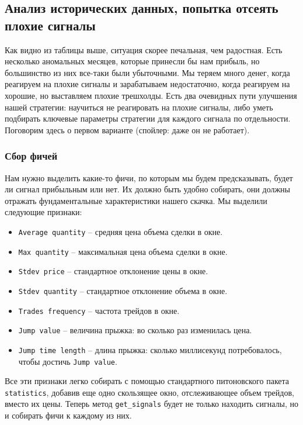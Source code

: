 \subsection{Анализ исторических данных, попытка отсеять плохие сигналы}
Как видно из таблицы выше, ситуация скорее печальная, чем радостная. Есть несколько аномальных месяцев, которые принесли бы нам прибыль, но большинство из них все-таки были убыточными. Мы теряем много денег, когда реагируем на плохие сигналы и зарабатываем недостаточно, когда реагируем на хорошие, но выставляем плохие трешхолды. Есть два очевидных пути улучшения нашей стратегии: научиться не реагировать на плохие сигналы, либо уметь подбирать ключевые параметры стратегии для каждого сигнала по отдельности. Поговорим здесь о первом варианте (спойлер: даже он не работает).

\subsubsection{Сбор фичей}
Нам нужно выделить какие-то фичи, по которым мы будем предсказывать, будет ли сигнал прибыльным или нет. Их должно быть удобно собирать, они должны отражать фундаментальные характеристики нашего скачка. Мы выделили следующие признаки:

\begin{itemize}
\item \texttt{Average quantity} -- средняя цена объема сделки в окне.
\item \texttt{Max quantity} -- максимальная цена объема сделки в окне.
\item \texttt{Stdev price} -- стандартное отклонение цены в окне.
\item \texttt{Stdev quantity} -- стандартное отклонение объема в окне.
\item \texttt{Trades frequency} -- частота трейдов в окне.
\item \texttt{Jump value} -- величина прыжка: во сколько раз изменилась цена.
\item \texttt{Jump time length} -- длина прыжка: сколько миллисекунд потребовалось, чтобы достичь \texttt{Jump value}.
\end{itemize}

Все эти признаки легко собирать с помощью стандартного питоновского пакета \texttt{statistics}, добавив еще одно скользящее окно, отслеживающее объем трейдов, вместо их цены. Теперь метод \texttt{get\_signals} будет не только находить сигналы, но и собирать фичи к каждому из них.

